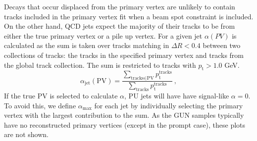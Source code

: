 Decays that occur displaced from the primary vertex are unlikely to contain tracks 
included in the primary vertex fit when a beam spot constraint is included.
On the other hand, QCD jets expect the majority of their tracks to be from either the true primary vertex or a pile up vertex.
For a given jet $\alpha(PV)$ is calculated as the sum is taken over tracks matching in $\Delta R< 0.4$ between two
collections of tracks: the tracks in the specified primary vertex and tracks from the global track collection. 
The sum is restricted to tracks with $p_{\textrm{t}} > 1.0$ GeV. 
\begin{equation}
\alpha_{\textrm{jet}}(\textrm{PV}) = \frac{\sum_{\textrm{tracks} \in \textrm{PV}} p_{\textrm{t}}^{\textrm{tracks}}}{\sum_{\textrm{tracks}} 
p_{\textrm{t}}^{\textrm{tracks}}}~,
\end{equation}
If the true PV is selected to calculate $\alpha$, PU jets will have have signal-like $\alpha=0$. 
To avoid this, we define $\alpha_{\textrm{max}}$ for each jet by individually selecting the primary vertex with
the largest contribution to the sum. As the GUN samples typically have no reconstructed primary vertices
 (except in the prompt case), these plots are not shown. 

